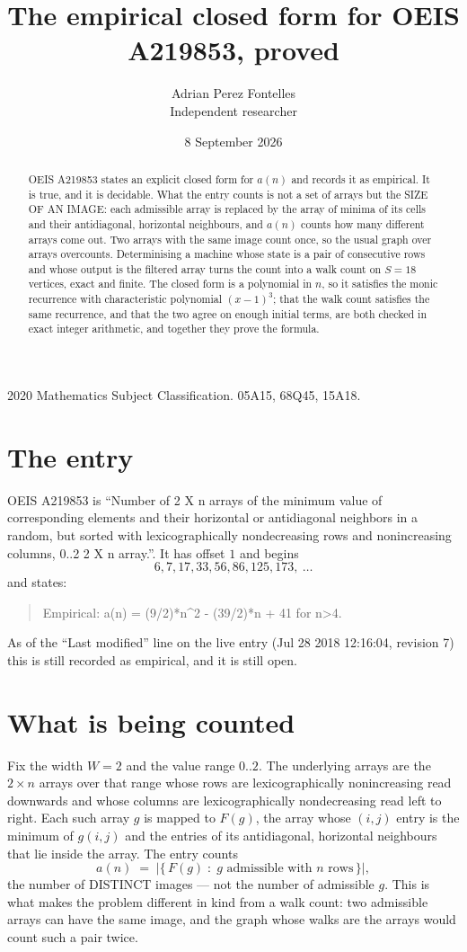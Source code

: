 \documentclass[11pt,a4paper]{article}
\title{The empirical closed form for OEIS A219853, proved}
\author{Adrian Perez Fontelles\\ \small Independent researcher}
\date{8 September 2026}
\theoremstyle{plain}
\theoremstyle{definition}
\begin{document}
\maketitle

\begin{abstract}
OEIS A219853 states an explicit closed form for $a(n)$ and records it as empirical. It is true, and
it is decidable. What the entry counts is not a set of arrays but the SIZE OF AN IMAGE: each
admissible array is replaced by the array of minima of its cells and their antidiagonal, horizontal neighbours,
and $a(n)$ counts how many different arrays come out. Two arrays with the same image count
once, so the usual graph over arrays overcounts. Determinising a machine whose state is a pair
of consecutive rows and whose output is the filtered array turns the count into a walk count on
$S=18$ vertices, exact and finite. The closed form is a polynomial in $n$, so it satisfies the
monic recurrence with characteristic polynomial $(x-1)^{3}$; that the walk count
satisfies the same recurrence, and that the two agree on enough initial terms, are both checked
in exact integer arithmetic, and together they prove the formula.
\end{abstract}

\noindent\small 2020 Mathematics Subject Classification. 05A15, 68Q45, 15A18.\normalsize

\section{The entry}

OEIS A219853 is ``Number of 2 X n arrays of the minimum value of corresponding elements and their horizontal or antidiagonal neighbors in a random, but sorted with lexicographically nondecreasing rows and nonincreasing columns, 0..2 2 X n array.''. It has offset $1$ and begins
\[
6, 7, 17, 33, 56, 86, 125, 173,\ \dots
\]
and states:
\begin{quote}
Empirical: a(n) = (9/2)*n\^{}2 - (39/2)*n + 41 for n>4.
\end{quote}
As of the ``Last modified'' line on the live entry (Jul 28 2018 12:16:04, revision 7)
this is still recorded as empirical, and it is still open.

\section{What is being counted}

Fix the width $W=2$ and the value range $0..2$. The underlying arrays are the
$2\times n$ arrays over that range whose rows are lexicographically nonincreasing read downwards
and whose columns are lexicographically nondecreasing read left to right. Each such array $g$
is mapped to $F(g)$, the array whose $(i,j)$ entry is the minimum of $g(i,j)$ and the entries
of its antidiagonal, horizontal neighbours that lie inside the array. The entry counts
\[
a(n)\;=\;\bigl|\{\,F(g)\;:\;g\text{ admissible with }n\text{ rows}\,\}\bigr|,
\]
the number of DISTINCT images --- not the number of admissible $g$. This is what makes the
problem different in kind from a walk count: two admissible arrays can have the same image, and
the graph whose walks are the arrays would count such a pair twice.
\end{document}
